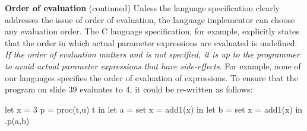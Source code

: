\begin{minipage}[t]{\sw}
\slidenumber
\LARGE
{\bf Order of evaluation} (continued)\exx
Unless the language specification clearly addresses the issue
of order of evaluation, the language implementor can choose
any evaluation order.
The C language specification, for example, explicitly states
that the order in which actual parameter expressions are evaluated
is undefined.
{\em If the order of evaluation matters and is not specified,
it is up to the programmer to
avoid actual parameter expressions that have side-effects}.
For example, none of our languages specifies
the order of evaluation of expressions.
To ensure that the program on slide 39 evaluates to 4,
it could be re-written as follows:
\begin{qv}
let
  x = 3
  p = proc(t,u) t
in
  let a = {set x = add1(x)}
  in
    let b = {set x = add1(x)}
    in 
      .p(a,b)
\end{qv}
\end{minipage}
